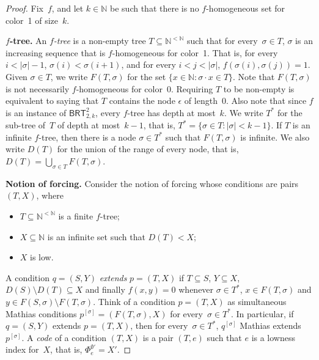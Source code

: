 \documentclass{article}
\newcommand{\BRT}[0]{\mathsf{BRT}}
\newcommand{\NN}[0]{\mathbb{N}}
\newtheorem{theorem}{Theorem}
\numberwithin{theorem}{section}
\begin{document}
\begin{proof}
Fix~$f$, and let $k \in \NN$ be such that there is no $f$-homogeneous set for color~1 of size~$k$.
\bigskip

\noindent
\textbf{$f$-tree.}
An \emph{$f$-tree} is a non-empty tree $T \subseteq \NN^{<\NN}$ such that for every~$\sigma \in T$, 
$\sigma$ is an increasing sequence that is $f$-homogeneous for color~1.  That is, for every $i < |\sigma|-1$, $\sigma(i) < \sigma(i+1)$, and for every $i < j < |\sigma|$, $f(\sigma(i), \sigma(j)) = 1$. 
Given $\sigma \in T$, we write $F(T, \sigma)$ for the set $\{ x \in \NN : \sigma \cdot x \in T \}$. Note that $F(T, \sigma)$ is not necessarily $f$-homogeneous for color~0. Requiring $T$ to be non-empty is equivalent to saying that $T$ contains the node $\epsilon$ of length~0. Also note that since $f$ is an instance of $\BRT^2_{2,k}$, every $f$-tree has depth at most~$k$. We write $T^*$ for the sub-tree of~$T$ of depth at most~$k-1$, that is, $T^* = \{ \sigma \in T : |\sigma| < k-1\}$. If $T$ is an infinite $f$-tree, then there is a node $\sigma \in T^*$ such that $F(T, \sigma)$ is infinite. We also write $D(T)$ for the union of the range of every node, that is, $D(T) = \bigcup_{\sigma \in T} F(T, \sigma)$.
\bigskip

\noindent
\textbf{Notion of forcing.}
Consider the notion of forcing whose conditions are pairs $(T, X)$, where
\begin{itemize}
    \item[(1)] $T \subseteq \NN^{<\NN}$ is a finite $f$-tree;
    \item[(2)] $X \subseteq \NN$ is an infinite set such that $D(T) < X$;
    \item[(3)] $X$ is low.
\end{itemize}
A condition $q = (S, Y)$ \emph{extends} $p = (T, X)$ if $T \subseteq S$, $Y \subseteq X$, $D(S) \setminus D(T) \subseteq X$ and finally $f(x,y) = 0$ whenever $\sigma \in T^*$, $x \in F(T, \sigma)$ and $y \in F(S, \sigma) \setminus F(T, \sigma)$.
Think of a condition $p = (T, X)$ as simultaneous Mathias conditions $p^{[\sigma]} = (F(T, \sigma), X)$ for every~$\sigma \in T^*$. In particular, if $q = (S, Y)$ extends $p = (T, X)$, then for every~$\sigma \in T^*$, $q^{[\sigma]}$ Mathias extends $p^{[\sigma]}$. A \emph{code} of a condition $(T, X)$ is a pair $(T, e)$ such that $e$ is a lowness index for~$X$, that is, $\Phi_e^{\emptyset'} = X'$. 


\end{proof}
\end{document}
